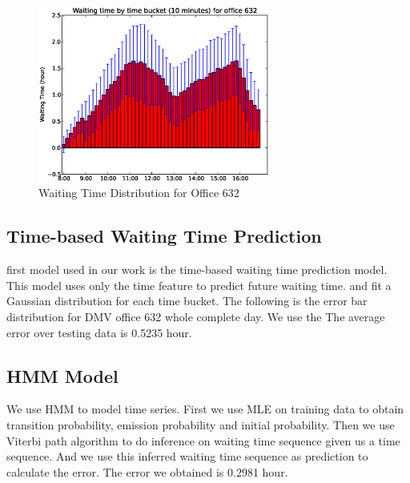 \documentclass[10pt, conference, compsocconf]{IEEEtran}
\begin{document}
\begin{figure}[!t]
\centering
\includegraphics[width=3in]{Office632.eps}
\caption{Waiting Time Distribution for Office 632}
\label{Waiting Time for Office 632}
\end{figure}

\subsection{Time-based Waiting Time Prediction} first model used in our work is the time-based waiting time prediction model. This model uses only the time feature
to predict future waiting time.  and fit a Gaussian
distribution for each time bucket. The following is the error bar distribution for DMV office 632 whole complete day. We use the 
The average error over testing data is 0.5235 hour. 





\subsection{HMM Model}
We use HMM to model time series. First we use MLE on training data to obtain transition probability, emission probability and
initial probability. Then we use Viterbi path algorithm to do inference on waiting time sequence given us a time sequence.
And we use this inferred waiting time sequence as prediction to calculate the error.
The error we obtained is 0.2981 hour. 
\end{document}
